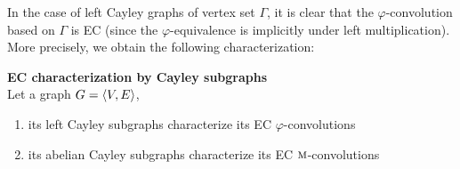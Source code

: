 In the case of left Cayley graphs of vertex set $\Gamma$, it is clear that the $\varphi$-convolution based on $\Gamma$ is EC (since the $\varphi$-equivalence is implicitly under left multiplication).
More precisely, we obtain the following characterization:


\begin{theorem}\textbf{EC characterization by Cayley subgraphs}\\
Let a graph $G = \langle V, E \rangle$,
\begin{enumerate}[nolistsep,noitemsep,label=(\roman*)]
\item its left Cayley subgraphs characterize its EC $\varphi$-convolutions
\item its abelian Cayley subgraphs characterize its EC $\operatorname{\textsc{m}}$-convolutions
\end{enumerate}
\label{th:cayleychar}
\end{theorem}

